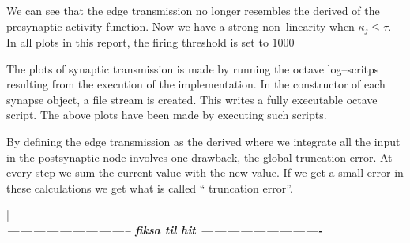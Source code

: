 			We can see that the edge transmission no longer resembles the derived of the presynaptic activity function. 
			Now we have a strong non--linearity when $\kappa_j \leq \tau$.
			In all plots in this report, the firing threshold is set to $1000$

			The plots of synaptic transmission is made by running the octave log--scritps resulting from the execution of the implementation.
			In the constructor of each synapse object, a file stream is created. 
			This writes a fully executable octave script. The above plots have been made by executing such scripts.


	
			By defining the edge transmission as the derived where we integrate all the input in the postsynaptic node involves one drawback, the global truncation error.
			At every step we sum the current value with the new value. If we get a small error in these calculations we get what is called `` truncation error''.


| \\ \emph{\bf\large{{----------------------------- fiksa til hit ----------------------------}}}\\




